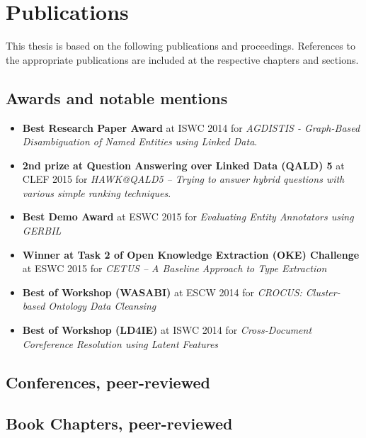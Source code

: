 \chapter*{Publications}

This thesis is based on the following publications and proceedings.
References to the appropriate publications are included at the respective chapters and sections.

\bigskip


\section*{Awards and notable mentions}
\begin{itemize}
    \item \textbf{Best Research Paper Award} at ISWC 2014 for \textit{AGDISTIS - Graph-Based Disambiguation of Named Entities using Linked Data}.
    \item \textbf{2nd prize at Question Answering over Linked Data (QALD) 5} at CLEF 2015 for \textit{HAWK@QALD5 -- Trying to answer hybrid questions with various simple ranking techniques}.
    \item \textbf{Best Demo Award} at ESWC 2015 for \textit{Evaluating Entity Annotators using GERBIL}
    \item \textbf{Winner at Task 2 of Open Knowledge Extraction (OKE) Challenge} at ESWC 2015 for \textit{CETUS – A Baseline Approach to Type Extraction}
    \item \textbf{Best of Workshop (WASABI)} at ESCW 2014 for \textit{CROCUS: Cluster-based Ontology Data Cleansing}
    \item \textbf{Best of Workshop (LD4IE)} at ISWC 2014 for \textit{Cross-Document Coreference Resolution using Latent Features} 
\end{itemize}

\section*{Conferences, peer-reviewed}

\section*{Book Chapters, peer-reviewed}

